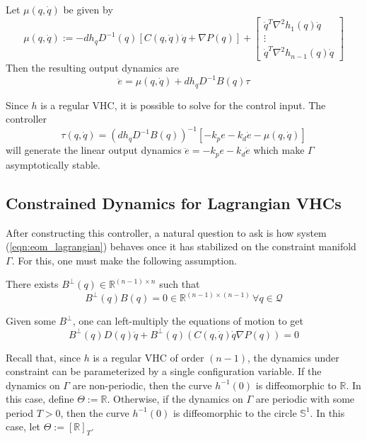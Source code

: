 Let \(\mu(q,\dot{q})\) be given by 
\begin{equation*}
   \mu(q,\dot{q}) := -dh_qD^{-1}(q)\left[C(q,\dot{q})\dot{q} + \nabla P(q) \right] 
      + \begin{bmatrix}
         \dot{q}^T \nabla^2 h_1(q) \dot{q} \\
         \vdots \\
         \dot{q}^T \nabla^2 h_{n-1}(q) \dot{q}
      \end{bmatrix}
\end{equation*}
Then the resulting output dynamics are
\begin{equation}\label{eqn:vhc_error_dynamics}
   \ddot{e} = \mu(q,\dot{q}) + dh_q D^{-1}B(q) \tau
\end{equation}

Since \(h\) is a regular VHC, it is possible to solve for the control input. 
The controller
\begin{equation*}
   \tau(q,\dot{q}) = \left(dh_q D^{-1}B(q)\right)^{-1}\left[-k_p e - k_d \dot{e} -
   \mu(q,\dot{q})\right]
\end{equation*}
will generate the linear output dynamics \(\ddot{e} = -k_p e - k_d\dot{e}\) 
which make \(\Gamma\) asymptotically stable.

\subsection{Constrained Dynamics for Lagrangian VHCs}
After constructing this controller, a natural question to ask is how system
(\ref{eqn:eom_lagrangian}) behaves once it has stabilized on the constraint
manifold \(\Gamma\). For this, one must make the following assumption.

\begin{assm}\label{assm:B_perp_exists}
   There exists \(B^\perp(q) \in \mathbb{R}^{(n-1) \times n}\) such that
   \[
      B^\perp(q) B(q) = 0 \in \mathbb{R}^{(n-1)\times(n-1)} \, \forall q \in
   \mathcal{Q}
   \]
\end{assm}

Given some \(B^\perp\), one can left-multiply the equations of motion to get
\begin{equation}\label{eqn:eom_lagrangian_with_B_perp}
   B^\perp(q)D(q)\ddot{q} + B^\perp(q)\left(C(q,\dot{q})\dot{q} \nabla
   P(q)\right) = 0
\end{equation}

Recall that, since \(h\) is a regular VHC of order \((n-1)\), the dynamics under
constraint can be parameterized by a single configuration variable.  If the
dynamics on \(\Gamma\) are non-periodic, then the curve \(h^{-1}(0)\) is
diffeomorphic to \(\mathbb{R}\). In this case, define \(\Theta := \mathbb{R}\).
Otherwise, if the dynamics on \(\Gamma\) are periodic with some period \(T > 0\), 
then the curve \(h^{-1}(0)\) is diffeomorphic to the circle
\(\mathbb{S}^1\). In this case, let \(\Theta := [\mathbb{R}]_T\).

